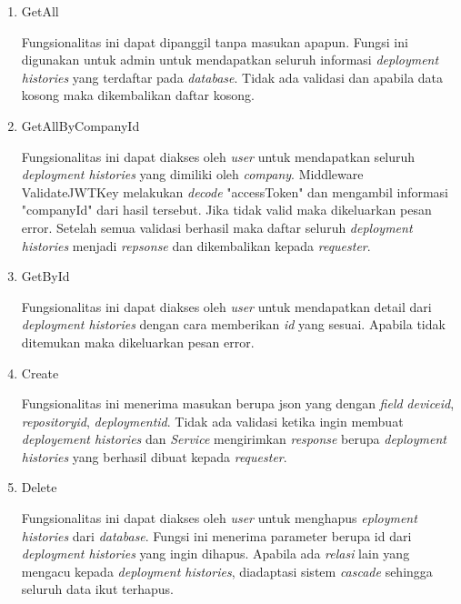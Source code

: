 \begin{enumerate}
  \item GetAll

        Fungsionalitas ini dapat dipanggil tanpa masukan apapun. Fungsi ini digunakan untuk admin untuk mendapatkan seluruh informasi \textit{deployment histories} yang terdaftar pada \textit{database}. Tidak ada validasi dan apabila data kosong maka dikembalikan daftar kosong.

  \item GetAllByCompanyId

        Fungsionalitas ini dapat diakses oleh \textit{user} untuk mendapatkan seluruh \textit{deployment histories} yang dimiliki oleh \textit{company}. Middleware ValidateJWTKey melakukan \textit{decode} "accessToken" dan mengambil informasi "companyId" dari hasil tersebut. Jika tidak valid maka dikeluarkan pesan error. Setelah semua validasi berhasil maka daftar seluruh \textit{deployment histories} menjadi \textit{repsonse} dan dikembalikan kepada \textit{requester}.

  \item GetById

        Fungsionalitas ini dapat diakses oleh \textit{user} untuk mendapatkan detail dari \textit{deployment histories} dengan cara memberikan \textit{id} yang sesuai. Apabila tidak ditemukan maka dikeluarkan pesan error.

  \item Create

        Fungsionalitas ini menerima masukan berupa json yang dengan \textit{field} \textit{device\textunderscore id}, \textit{repository\textunderscore id}, \textit{deployment\textunderscore id}. Tidak ada validasi ketika ingin membuat \textit{deployement histories} dan \textit{Service} mengirimkan \textit{response} berupa \textit{deployment histories} yang berhasil dibuat kepada \textit{requester}.

  \item Delete

        Fungsionalitas ini dapat diakses oleh \textit{user} untuk menghapus \textit{eployment histories} dari \textit{database}. Fungsi ini menerima parameter berupa id dari \textit{deployment histories} yang ingin dihapus. Apabila ada \textit{relasi} lain yang mengacu kepada \textit{deployment histories}, diadaptasi sistem \textit{cascade} sehingga seluruh data ikut terhapus.

\end{enumerate}

